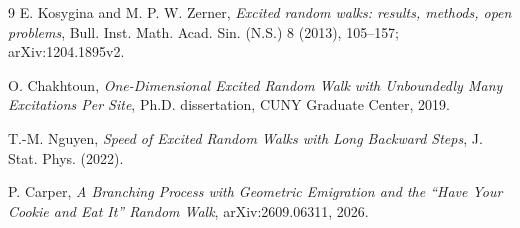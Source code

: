 \documentclass[11pt]{article}
\begin{document}
\begin{thebibliography}{9}
E. Kosygina and M. P. W. Zerner,
\emph{Excited random walks: results, methods, open problems},
Bull. Inst. Math. Acad. Sin. (N.S.) 8 (2013), 105--157;
arXiv:1204.1895v2.

O. Chakhtoun,
\emph{One-Dimensional Excited Random Walk with Unboundedly Many Excitations Per Site},
Ph.D. dissertation, CUNY Graduate Center, 2019.

T.-M. Nguyen,
\emph{Speed of Excited Random Walks with Long Backward Steps},
J. Stat. Phys. (2022).

P. Carper,
\emph{A Branching Process with Geometric Emigration and the ``Have Your Cookie and Eat It'' Random Walk},
arXiv:2609.06311, 2026.
\end{thebibliography}
\end{document}

